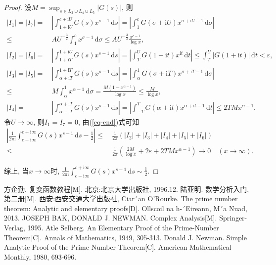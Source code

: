 \documentclass[12pt, a4paper, oneside]{ctexart}
\numberwithin{equation}{section}  %
\let\leq=\leqslant %
\let\epsilon=\varepsilon %
\def\d{\mathrm{d}}          %
\def\i{\mathrm{i}}          %
\begin{document}
\begin{proof}
    设$M = \sup_{s\in L_3\cup L_4\cup L_5}|G(s)|$, 则
    \begin{equation*}
        \begin{aligned}
            |I_1| = |I_7| =&\ \left|\int_{1+\i U}^{c+\i U}G(s)x^{s-1}\,\d s\right| = \left|\int_1^cG(\sigma+\i U)x^{\sigma+\i U-1}\,\d \sigma\right|\\
            \leq&\ AU^{-\frac{3}{2}}\int_1^cx^{\sigma-1}\,\d \sigma\leq AU^{-\frac{3}{2}}\frac{x^{c-1}}{\log x},\\
            |I_2| = |I_6| =&\ \left|\int_{1+\i T}^{1+\i U}G(s)x^{s-1}\,\d s\right| = \left|\int_{T}^{U}G(1+\i t)x^{\i t}\,\d t\right| \leq \int_T^U|G(1+\i t)|\,\d t < \epsilon,\\
            |I_3| = |I_5| =&\ \left|\int_{\alpha+\i T}^{1+\i T}G(s)x^{s-1}\,\d s\right| = \left|\int_{\alpha}^1G(\sigma + \i T)x^{\sigma+\i T-1}\,\d \sigma\right|\\
            \leq&\ M\int_{\alpha}^1x^{\alpha-1}\,\d\sigma = \frac{M(1-x^{\alpha-1})}{\log x}\leq \frac{M}{\log x},\\
            |I_4|=&\ \left|\int_{\alpha-\i T}^{\alpha+\i T}G(s)x^{s-1}\,\d s\right|=\left|\int_{-T}^TG(\alpha+\i t)x^{\alpha+\i t-1}\,\d t\right|\leq 2TMx^{\alpha-1}.
        \end{aligned}
    \end{equation*}
    令$U\to \infty$, 则$I_1=I_7=0$, 由(\ref{eq-end})式可知
    \begin{equation*}
        \begin{aligned}
        \left|\frac{1}{2\pi \i}\int_{c-\i\infty}^{c+\i\infty}G(s)x^{s-1}\,\d s-\frac{1}{2}\right|\leq&\ \frac{1}{2\pi}(|I_2|+|I_3|+|I_4|+|I_5|+|I_6|)\\
        \leq&\ \frac{1}{2\pi}\left(\frac{2M}{\log x}+2\epsilon+2TMx^{\alpha-1}\right)\to 0\quad(x\to \infty).
        \end{aligned}
    \end{equation*}

    综上, 当$x\to\infty$时, $\frac{1}{2\pi\i}\int_{c-\i\infty}^{c+\i\infty}G(s)x^{s-1}\,\d s\sim \frac{1}{2}$.
\end{proof}

\clearpage
\begin{thebibliography}{99}
    方企勤. 复变函数教程[M]. 北京:北京大学出版社, 1996.12.
    陆亚明. 数学分析入门, 第二册[M]. 西安:西安交通大学出版社, 
    Ciar´an O’Rourke. The prime number theorem: Analytic and elementary proofs[D]. Ollscoil na h-´Eireann, M´a Nuad, 2013.
    JOSEPH BAK, DONALD J. NEWMAN. Complex Analysis[M]. Springer-Verlag, 1995.
    Atle Selberg. An Elementary Proof of the Prime-Number Theorem[C]. Annals of Mathematics, 1949, 305-313.
    Donald J. Newman. Simple Analytic Proof of the Prime Number Theorem[C]. American Mathematical Monthly, 1980, 693-696.
\end{thebibliography}
\end{document}
